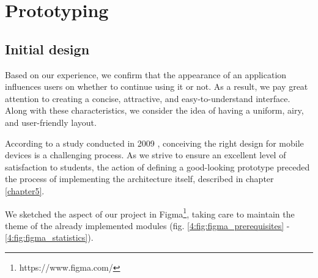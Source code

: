 \section{Prototyping} \label{4:prototyping}

    \subsection{Initial design} \label{4:initial_design}
    
    Based on our experience, we confirm that the appearance of an application influences users on whether to continue using it or not. As a result, we pay great attention to creating a concise, attractive, and easy-to-understand interface. Along with these characteristics, we consider the idea of having a uniform, airy, and user-friendly layout.
    
    According to a study conducted in 2009 \cite{2009design}, conceiving the right design for mobile devices is a challenging process. As we strive to ensure an excellent level of satisfaction to students, the action of defining a good-looking prototype preceded the process of implementing the architecture itself, described in chapter \ref{chapter5}.
    
    We sketched the aspect of our project in Figma\footnote{https://www.figma.com/}, taking care to maintain the theme of the already implemented modules (fig. \ref{4:fig:figma_prerequisites} - \ref{4:fig:figma_statistics}).
    
